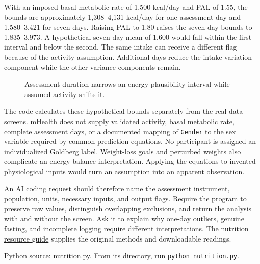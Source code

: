 With an imposed basal metabolic rate of 1,500 kcal/day and PAL of 1.55,
the bounds are approximately 1,308--4,131 kcal/day for one assessment
day and 1,580--3,421 for seven days. Raising PAL to 1.80 raises the
seven-day bounds to 1,835--3,973. A hypothetical seven-day mean of 1,600
would fall within the first interval and below the second. The same
intake can receive a different flag because of the activity assumption.
Additional days reduce the intake-variation component while the other
variance components remain.

\begin{figure}[htbp]
\centering

\caption{Assessment duration narrows an energy-plausibility interval while assumed activity shifts it.}\label{fig:M02_mhealth_goldberg}
\end{figure}

The code calculates these hypothetical bounds separately from the
real-data screens. mHealth does not supply validated activity, basal
metabolic rate, complete assessment days, or a documented mapping of
\texttt{Gender} to the sex variable required by common prediction
equations. No participant is assigned an individualized Goldberg label.
Weight-loss goals and perturbed weights also complicate an
energy-balance interpretation. Applying the equations to invented
physiological inputs would turn an assumption into an apparent
observation.

An AI coding request should therefore name the assessment instrument,
population, units, necessary inputs, and output flags. Require the
program to preserve raw values, distinguish overlapping exclusions, and
return the analysis with and without the screen. Ask it to explain why
one-day outliers, genuine fasting, and incomplete logging require
different interpretations. The
\href{../01_Resources/12_Nutrition_and_Dietary_Data_Quality/README.md}{nutrition
resource guide} supplies the original methods and downloadable readings.

\FloatBarrier
{}
Python source:
\href{../03_Data_and_Code/mHealth/recurring_examples/nutrition.py}{nutrition.py}.
From its directory, run \texttt{python\ nutrition.py}.

